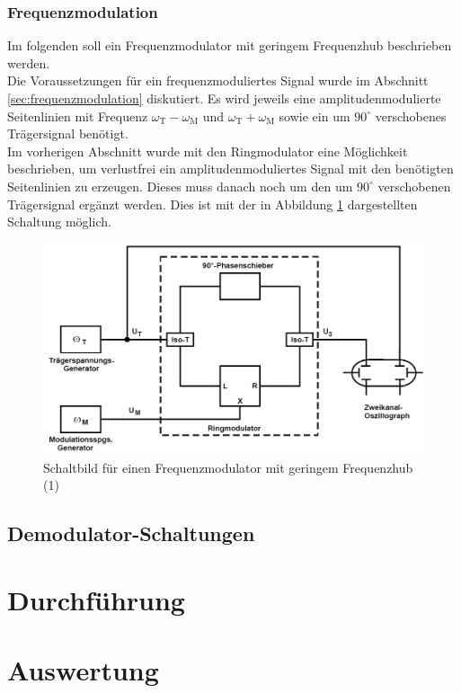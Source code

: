 \documentclass[]{scrartcl}
\begin{document}
\subsubsection*{Frequenzmodulation}
Im folgenden soll ein Frequenzmodulator mit geringem Frequenzhub beschrieben werden.\\
Die Voraussetzungen für ein frequenzmoduliertes Signal wurde im Abschnitt \ref{sec:frequenzmodulation} diskutiert. Es wird jeweils eine amplitudenmodulierte Seitenlinien mit Frequenz $\omega_{\text{T}}-\omega_{\text{M}}$ und $\omega_{\text{T}}+\omega_{\text{M}}$ sowie ein um $90^\circ$ verschobenes Trägersignal benötigt.\\
Im vorherigen Abschnitt wurde mit den Ringmodulator eine Möglichkeit beschrieben, um verlustfrei ein amplitudenmoduliertes Signal mit den benötigten Seitenlinien zu erzeugen. Dieses muss danach noch um den um $90^\circ$ verschobenen Trägersignal ergänzt werden. Dies ist mit der in Abbildung \ref{fig:frequenzmodulationsschaltung} dargestellten Schaltung möglich.
\begin{figure}[H]
\centering 
\includegraphics[width=13cm]{images/frequenzmodulationsschaltung.png}
\caption{Schaltbild für einen Frequenzmodulator mit geringem Frequenzhub (1)}
\label{fig:frequenzmodulationsschaltung}
\end{figure} 
\subsection{Demodulator-Schaltungen}

\section{Durchführung}

\section{Auswertung}
\end{document}
